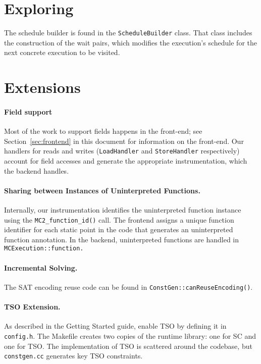 \documentclass[10pt,nocopyrightspace,preprint]{sigplanconf}
\begin{document}
\section{Exploring}
The schedule builder is found in the {\tt ScheduleBuilder} class. That
class includes the construction of the wait pairs, which modifies the
execution's schedule for the next concrete execution to be visited.

\section{Extensions}
\paragraph{Field support}
Most of the work to support fields happens in the front-end; see
Section~\ref{sec:frontend} in this document for information on the
front-end. Our handlers for reads and writes ({\tt LoadHandler} and
{\tt StoreHandler} respectively) account for field accesses and
generate the appropriate instrumentation, which the backend handles.

\paragraph{Sharing between Instances of Uninterpreted Functions.}
Internally, our instrumentation identifies the uninterpreted function
instance using the {\tt MC2\_function\_id()} call. The frontend
assigns a unique function identifier for each static point in the code
that generates an uninterpreted function annotation. In the backend,
uninterpreted functions are handled in {\tt MCExecution::function.}

\paragraph{Incremental Solving.} 
The SAT encoding reuse code can be found in {\tt ConstGen::canReuseEncoding()}.

\paragraph{TSO Extension.} As described in the Getting Started guide, enable
TSO by defining it in {\tt config.h}. The Makefile creates two copies of the runtime library:
one for SC and one for TSO. The implementation of TSO is scattered around
the codebase, but {\tt constgen.cc} generates key TSO constraints.
\end{document}
